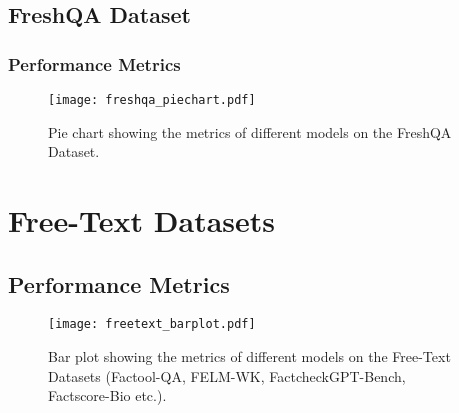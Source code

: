 \documentclass[12pt]{article}
\begin{document}
\newpage

\subsection{FreshQA Dataset}
\subsubsection{Performance Metrics}
\begin{figure}[H]
    \centering
    \texttt{[image: freshqa\_piechart.pdf]}
    \caption{Pie chart showing the metrics of different models on the FreshQA Dataset.}
\end{figure}

\newpage

\section{Free-Text Datasets}
\subsection{Performance Metrics}
\begin{figure}[H]
    \centering
    \texttt{[image: freetext\_barplot.pdf]}
    \caption{Bar plot showing the metrics of different models on the Free-Text Datasets (Factool-QA, FELM-WK, FactcheckGPT-Bench, Factscore-Bio etc.).}
\end{figure}
\end{document}
